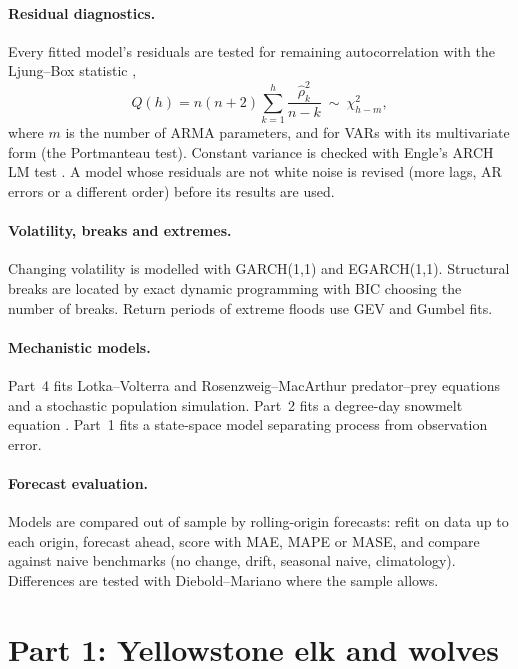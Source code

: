 \documentclass[11pt,a4paper]{article}
\begin{document}
\paragraph{Residual diagnostics.} Every fitted model's residuals are tested for remaining autocorrelation with the Ljung--Box statistic \citep{ljungbox1978},
\begin{equation}
Q(h)=n(n+2)\sum_{k=1}^{h}\frac{\hat\rho_k^2}{n-k}\ \sim\ \chi^2_{h-m},
\end{equation}
where $m$ is the number of ARMA parameters, and for VARs with its multivariate form (the Portmanteau test). Constant variance is checked with Engle's ARCH LM test \citep{engle1982}. A model whose residuals are not white noise is revised (more lags, AR errors or a different order) before its results are used.

\paragraph{Volatility, breaks and extremes.} Changing volatility is modelled with GARCH(1,1) and EGARCH(1,1). Structural breaks are located by exact dynamic programming with BIC choosing the number of breaks. Return periods of extreme floods use GEV and Gumbel fits.

\paragraph{Mechanistic models.} Part~4 fits Lotka--Volterra and Rosenzweig--MacArthur predator--prey equations and a stochastic population simulation. Part~2 fits a degree-day snowmelt equation \citep{hock2003}. Part~1 fits a state-space model separating process from observation error.

\paragraph{Forecast evaluation.} Models are compared out of sample by rolling-origin forecasts: refit on data up to each origin, forecast ahead, score with MAE, MAPE or MASE, and compare against naive benchmarks (no change, drift, seasonal naive, climatology). Differences are tested with Diebold--Mariano where the sample allows.

\section{Part 1: Yellowstone elk and wolves}
\end{document}
